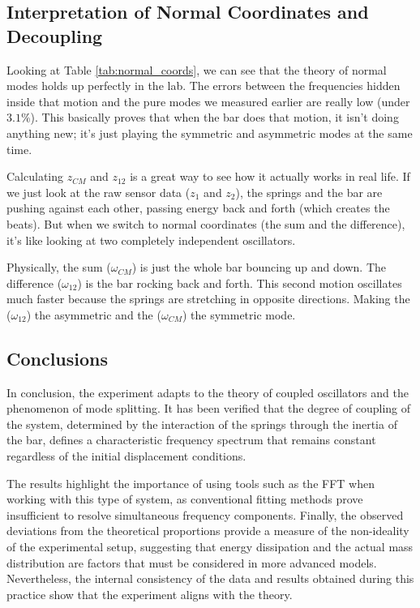 \documentclass[a4paper,11pt]{article}
\begin{document}
\subsection{Interpretation of Normal Coordinates and Decoupling}
Looking at Table \ref{tab:normal_coords}, we can see that the theory of normal modes holds up perfectly in the lab. The errors between the frequencies hidden inside that motion and the pure modes we measured earlier are really low (under $3.1\%$). This basically proves that when the bar does that motion, it isn't doing anything new; it’s just playing the symmetric and asymmetric modes at the same time.

Calculating $z_{CM}$ and $z_{12}$ is a great way to see how it actually works in real life. If we just look at the raw sensor data ($z_1$ and $z_2$), the springs and the bar are pushing against each other, passing energy back and forth (which creates the beats). But when we switch to normal coordinates (the sum and the difference), it's like looking at two completely independent oscillators. 

Physically, the sum ($\omega_{CM}$) is just the whole bar bouncing up and down. The difference ($\omega_{12}$) is the bar rocking back and forth. This second motion oscillates much faster because the springs are stretching in opposite directions. Making the ($\omega_{12}$) the asymmetric and the ($\omega_{CM}$) the symmetric mode.

\subsection{Conclusions}
In conclusion, the experiment adapts to the theory of coupled oscillators and the phenomenon of mode splitting. It has been verified that the degree of coupling of the system, determined by the interaction of the springs through the inertia of the bar, defines a characteristic frequency spectrum that remains constant regardless of the initial displacement conditions. 

The results highlight the importance of using tools such as the FFT when working with this type of system, as conventional fitting methods prove insufficient to resolve simultaneous frequency components. Finally, the observed deviations from the theoretical proportions provide a measure of the non-ideality of the experimental setup, suggesting that energy dissipation and the actual mass distribution are factors that must be considered in more advanced models. Nevertheless, the internal consistency of the data and results obtained during this practice show that the experiment aligns with the theory.
\end{document}
